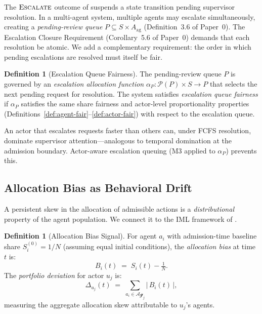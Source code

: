 \documentclass[11pt]{article}
\theoremstyle{plain}
\theoremstyle{definition}
\newtheorem{definition}[theorem]{Definition}
\theoremstyle{remark}
\newcommand{\Escalate}{\textsc{Escalate}}
\newcommand{\Agents}{\mathcal{Ag}}         %
\newcommand{\Share}[1]{S_{#1}}             %
\newcommand{\alloc}{\alpha}                %
\begin{document}
The $\Escalate$ outcome of \citet{fernandez2026a} suspends a state
transition pending supervisor resolution.  In a multi-agent system,
multiple agents may escalate simultaneously, creating a
\emph{pending-review queue} $P \subseteq S \times A_{\mathrm{ag}}$
(Definition~3.6 of Paper~0).  The Escalation Closure Requirement
(Corollary~5.6 of Paper~0) demands that each resolution be atomic.
We add a complementary requirement: the order in which pending
escalations are resolved must itself be fair.

\begin{definition}[Escalation Queue Fairness]
\label{def:esc-fair}
The pending-review queue $P$ is governed by an \emph{escalation
allocation function} $\alloc_P : \mathcal{P}(P) \times S \to P$
that selects the next pending request for resolution.  The system
satisfies \emph{escalation queue fairness} if $\alloc_P$ satisfies
the same share fairness and actor-level proportionality properties
(Definitions~\ref{def:agent-fair}--\ref{def:actor-fair}) with respect
to the escalation queue.
\end{definition}

An actor that escalates requests faster than others can, under FCFS
resolution, dominate supervisor attention---analogous to temporal
domination at the admission boundary.  Actor-aware escalation queuing
(M3 applied to $\alloc_P$) prevents this.

\subsection{Allocation Bias as Behavioral Drift}
\label{sec:alloc-bias}

A persistent skew in the allocation of admissible actions is a
\emph{distributional} property of the agent population.  We connect
it to the IML framework of \citet{fernandez2026c}.

\begin{definition}[Allocation Bias Signal]
\label{def:abs}
For agent $a_i$ with admission-time baseline share $\Share{i}^{(0)} =
1/N$ (assuming equal initial conditions), the \emph{allocation bias}
at time $t$ is:
\[
  B_i(t) \;=\; \Share{i}(t) - \tfrac{1}{N}.
\]
The \emph{portfolio deviation} for actor $u_j$ is:
\[
  \Delta_{u_j}(t) \;=\;
  \sum_{a_i \in \Agents_j} \bigl|\, B_i(t)\,\bigr|,
\]
measuring the aggregate allocation skew attributable to $u_j$'s agents.
\end{definition}
\end{document}
